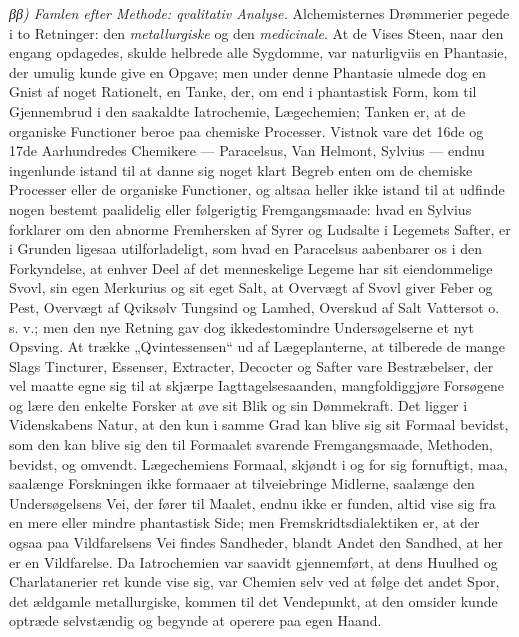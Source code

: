 \documentclass[12pt,a4paper]{book}
\begin{document}
\emph{ββ) Famlen efter Methode: qvalitativ Analyse.}
Alchemisternes Drømmerier pegede i to Retninger: den
\emph{metallurgiske} og den \emph{medicinale}. At de Vises Steen,
naar den engang opdagedes, skulde helbrede alle Sygdomme,
var naturligviis en Phantasie, der umulig kunde give en
Opgave; men under denne Phantasie ulmede dog en Gnist af
noget Rationelt, en Tanke, der, om end i phantastisk Form,
kom til Gjennembrud i den saakaldte Iatrochemie, Lægechemien;
Tanken er, at de organiske Functioner beroe paa chemiske
Processer. Vistnok vare det 16de og 17de Aarhundredes
Chemikere --- Paracelsus, Van Helmont, Sylvius --- endnu
ingenlunde istand til at danne sig noget klart Begreb enten
om de chemiske Processer eller de organiske Functioner, og
altsaa heller ikke istand til at udfinde nogen bestemt paalidelig
eller følgerigtig Fremgangsmaade: hvad en Sylvius forklarer
om den abnorme Fremhersken af Syrer og Ludsalte i Legemets
Safter, er i Grunden ligesaa utilforladeligt, som hvad en
Paracelsus aabenbarer os i den Forkyndelse, at enhver Deel
af det menneskelige Legeme har sit eiendommelige Svovl, sin
egen Merkurius og sit eget Salt, at Overvægt af Svovl
giver Feber og Pest, Overvægt af Qviksølv Tungsind og
Lamhed, Overskud af Salt Vattersot o. s. v.; men den nye
Retning gav dog ikkedestomindre Undersøgelserne et nyt
Opsving. At trække „Qvintessensen“ ud af Lægeplanterne,
at tilberede de mange Slags Tincturer, Essenser, Extracter,
Decocter og Safter vare Bestræbelser, der vel maatte egne
sig til at skjærpe Iagttagelsesaanden, mangfoldiggjøre Forsøgene
og lære den enkelte Forsker at øve sit Blik og sin
Dømmekraft. Det ligger i Videnskabens Natur, at den kun
i samme Grad kan blive sig sit Formaal bevidst, som den
kan blive sig den til Formaalet svarende Fremgangsmaade,
Methoden, bevidst, og omvendt. Lægechemiens Formaal, skjøndt
i og for sig fornuftigt, maa, saalænge Forskningen ikke formaaer
at tilveiebringe Midlerne, saalænge den Undersøgelsens
Vei, der fører til Maalet, endnu ikke er funden, altid vise
sig fra en mere eller mindre phantastisk Side; men
Fremskridtsdialektiken er, at der ogsaa paa Vildfarelsens Vei
findes Sandheder, blandt Andet den Sandhed, at her er en
Vildfarelse. Da Iatrochemien var saavidt gjennemført, at
dens Huulhed og Charlatanerier ret kunde vise sig, var
Chemien selv ved at følge det andet Spor, det ældgamle
metallurgiske, kommen til det Vendepunkt, at den omsider kunde
optræde selvstændig og begynde at operere paa egen Haand.
\end{document}
